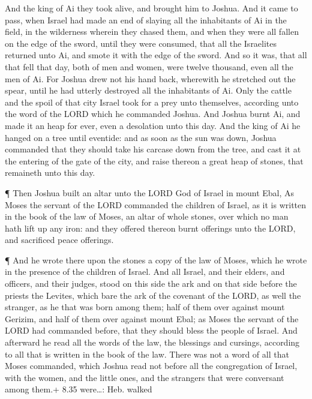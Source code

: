  And the king of Ai they took alive, and brought him to
Joshua.  And it came to pass, when Israel had made an end
of slaying all the inhabitants of Ai in the field, in the wilderness
wherein they chased them, and when they were all fallen on the edge of
the sword, until they were consumed, that all the Israelites returned
unto Ai, and smote it with the edge of the sword.  And so
it was, that all that fell that day, both of men and women, were twelve
thousand, even all the men of Ai.  For Joshua drew not his
hand back, wherewith he stretched out the spear, until he had utterly
destroyed all the inhabitants of Ai.  Only the cattle and
the spoil of that city Israel took for a prey unto themselves, according
unto the word of the LORD which he commanded Joshua.  And
Joshua burnt Ai, and made it an heap for ever, even a desolation unto
this day.  And the king of Ai he hanged on a tree until
eventide: and as soon as the sun was down, Joshua commanded that they
should take his carcase down from the tree, and cast it at the entering
of the gate of the city, and raise thereon a great heap of stones, that
remaineth unto this day.

 ¶ Then Joshua built an altar unto the LORD God of Israel
in mount Ebal,  As Moses the servant of the LORD commanded
the children of Israel, as it is written in the book of the law of
Moses, an altar of whole stones, over which no man hath lift up any
iron: and they offered thereon burnt offerings unto the LORD, and
sacrificed peace offerings.

 ¶ And he wrote there upon the stones a copy of the law of
Moses, which he wrote in the presence of the children of Israel.
 And all Israel, and their elders, and officers, and their
judges, stood on this side the ark and on that side before the priests
the Levites, which bare the ark of the covenant of the LORD, as well the
stranger, as he that was born among them; half of them over against
mount Gerizim, and half of them over against mount Ebal; as Moses the
servant of the LORD had commanded before, that they should bless the
people of Israel.  And afterward he read all the words of
the law, the blessings and cursings, according to all that is written in
the book of the law.  There was not a word of all that
Moses commanded, which Joshua read not before all the congregation of
Israel, with the women, and the little ones, and the strangers that were
conversant among them.+ 8.35 were\ldots: Heb. walked

